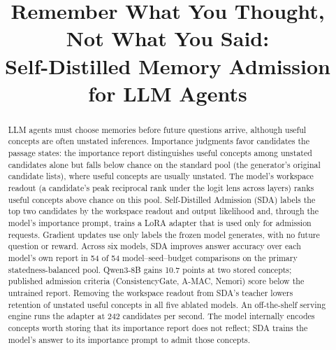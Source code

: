 \documentclass[11pt]{article}
\title{Remember What You Thought, Not What You Said:\\
Self-Distilled Memory Admission for LLM Agents}
\author{}
\begin{document}
\maketitle

\begin{abstract}
LLM agents must choose memories before future questions arrive, although
useful concepts are often unstated inferences. Importance judgments favor
candidates the passage states: the importance report distinguishes
useful concepts among unstated candidates alone but falls below chance
on the standard pool (the generator's original candidate lists), where
useful concepts are usually unstated. The model's workspace readout
(a candidate's peak reciprocal rank under the logit lens across layers)
ranks useful concepts above chance on this pool. Self-Distilled Admission
(SDA) labels the top two candidates by the workspace readout and output
likelihood and, through the model's importance prompt, trains a LoRA
adapter that is used only for admission requests. Gradient updates use
only labels the frozen model generates, with no future question or reward.
Across six models, SDA improves answer accuracy over each model's own
report in 54 of 54 model--seed--budget comparisons on the primary
statedness-balanced pool.
Qwen3-8B gains 10.7 points at two stored concepts; published admission
criteria (ConsistencyGate, A-MAC, Nemori) score below the untrained report.
Removing the workspace readout from SDA's teacher lowers retention of
unstated useful concepts in all five ablated models.
An off-the-shelf serving engine runs the adapter at 242 candidates per
second. The model internally encodes concepts worth storing that its
importance report does not reflect; SDA trains the model's answer to its
importance prompt to admit those concepts.
\end{abstract}










\FloatBarrier


\clearpage
\appendix

\end{document}
